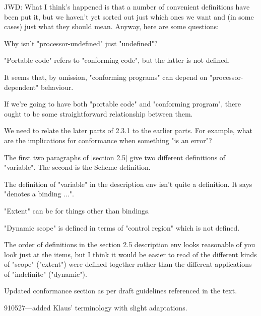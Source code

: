 %
\label{subsubsec:cse}
\begin{optPrivate}
    JWD: What I think's happened is that a number of convenient definitions have
    been put it, but we haven't yet sorted out just which ones we want and (in
    some cases) just what they should mean.  Anyway, here are some questions:

    Why isn't "processor-undefined" just "undefined"?

    "Portable code" refers to "conforming code", but the latter is not defined.

    It seems that, by omission, "conforming programs" can depend on
    "processor-dependent" behaviour.

    If we're going to have both "portable code" and "conforming program", there
    ought to be some straightforward relationship between them.

    We need to relate the later parts of 2.3.1 to the earlier parts.  For
    example, what are the implications for conformance when something "is an
    error"?

    The first two paragraphs of [section 2.5] give two different definitions of
    "variable".  The second is the Scheme definition.

    The definition of "variable" in the description env isn't quite a
    definition.  It says "denotes a binding ...".

    "Extent" can be for things other than bindings.

    "Dynamic scope" is defined in terms of "control region" which is not
    defined.

    The order of definitions in the section 2.5 description env looks reasonable
    of you look just at the items, but I think it would be easier to read of the
    different kinds of "scope" ("extent") were defined together rather than the
    different applications of "indefinite" ("dynamic").

    Updated conformance section as per draft guidelines referenced in the text.

    910527---added Klaus' terminology with slight adaptations.
\end{optPrivate}
%
